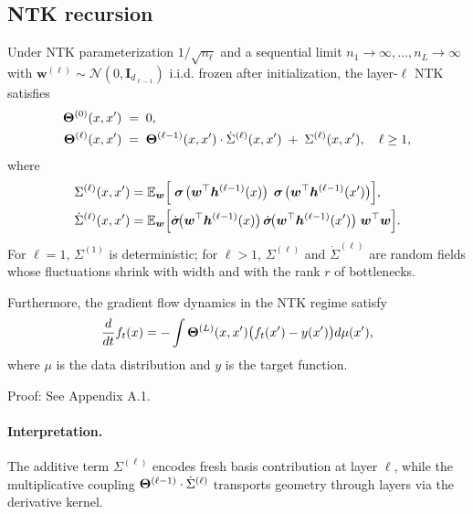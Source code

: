 \vspace{1em}
\subsection{NTK recursion}
\begin{theorem}
\label{thm:ntk_recursion}
Under NTK parameterization \( 1/\sqrt{n_\ell} \) and a sequential limit \( n_1\to\infty,\dots,n_L\to\infty \) with \( \bm{w}^{(\ell)} \sim \mathcal{N}(0, \mathbf{I}_{d_{\ell-1}}) \) i.i.d. frozen after initialization, the layer-\( \ell \) NTK satisfies
\begin{align}
\boldsymbol{\Theta}^{(0)}(x,x') \;&=\; 0, \\
\boldsymbol{\Theta}^{(\ell)}(x,x') \;&=\; \boldsymbol{\Theta}^{(\ell-1)}(x,x')\cdot\dot{\Sigma}^{(\ell)}(x,x')\;+\;\Sigma^{(\ell)}(x,x'),\quad \ell\ge1,
\end{align}
where
\begin{align}
\Sigma^{(\ell)}(x,x') &= \mathbb{E}_{\bm{w}}\Big[\mathrel{\boldsymbol{\sigma}}\!\big(\bm{w}^\top \bm{h}^{(\ell-1)}(x)\big)\,\mathrel{\boldsymbol{\sigma}}\!\big(\bm{w}^\top \bm{h}^{(\ell-1)}(x')\big)\Big], \\
\dot{\Sigma}^{(\ell)}(x,x') &= \mathbb{E}_{\bm{w}}\Big[\dot{\mathrel{\boldsymbol{\sigma}}}\!\big(\bm{w}^\top \bm{h}^{(\ell-1)}(x)\big)\,\dot{\mathrel{\boldsymbol{\sigma}}}\!\big(\bm{w}^\top \bm{h}^{(\ell-1)}(x')\big)\;\bm{w}^\top\bm{w}\Big].
\end{align}
For \( \ell=1 \), \( \Sigma^{(1)} \) is deterministic; for \( \ell>1 \), \( \Sigma^{(\ell)} \) and \( \dot{\Sigma}^{(\ell)} \) are random fields whose fluctuations shrink with width and with the rank \( r \) of bottlenecks.

Furthermore, the gradient flow dynamics in the NTK regime satisfy
\[
\frac{d}{dt}f_t(x) = -\int \boldsymbol{\Theta}^{(L)}(x,x') \big(f_t(x') - y(x')\big) d\mu(x'),
\]
where \( \mu \) is the data distribution and \( y \) is the target function.
\end{theorem}

Proof: See Appendix A.1.

\paragraph{Interpretation.} The additive term \( \Sigma^{(\ell)} \) encodes fresh basis contribution at layer \( \ell \), while the multiplicative coupling \( \boldsymbol{\Theta}^{(\ell-1)}\cdot\dot{\Sigma}^{(\ell)} \) transports geometry through layers via the derivative kernel.
